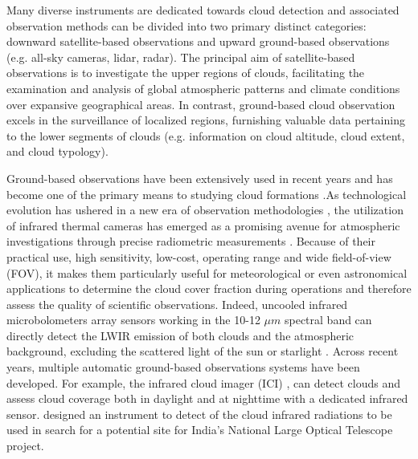 \documentclass{article}
\begin{document}
Many diverse instruments are dedicated towards cloud detection and associated observation methods can be divided into two primary distinct categories: downward satellite-based observations and upward ground-based observations (e.g. all-sky cameras, lidar, radar). The principal aim of satellite-based observations is to investigate the upper regions of clouds, facilitating the examination and analysis of global atmospheric patterns and climate conditions over expansive geographical areas. In contrast, ground-based cloud observation excels in the surveillance of localized regions, furnishing valuable data pertaining to the lower segments of clouds (e.g. information on cloud altitude, cloud extent, and cloud typology).

Ground-based observations have been extensively used in recent years and has become one of the primary means to studying cloud formations \citep{paczynski2000monitoring}.As technological evolution has ushered in a new era of observation methodologies \citep{mandat2014all}, the utilization of infrared thermal cameras has emerged as a promising avenue for atmospheric investigations through precise radiometric measurements \citep{Szejwach1982, Shaw_2013, liandrat2017cloud, lopez2017contribution, Klebe2014, nikolenko2021infrared}.
Because of their practical use, high sensitivity, low-cost, operating range and wide field-of-view (FOV), it makes them particularly useful for meteorological or even astronomical applications to determine the cloud cover fraction during operations and therefore assess the quality of scientific observations. Indeed, uncooled infrared microbolometers array sensors working in the 10-12 $\mu m$ spectral band can directly detect the LWIR emission of both clouds and the atmospheric background, excluding the scattered light of the sun or starlight \citep{Houghton1972}.
Across recent years, multiple automatic ground-based observations systems have been developed. For example, the infrared cloud imager (ICI) \citep{ICI}, can detect clouds and assess cloud coverage both in daylight and at nighttime with a dedicated infrared sensor. \citet{Sharma_2015} designed an instrument to detect of the cloud infrared radiations to be used in search for a potential site for India’s National Large Optical Telescope project.
\end{document}
